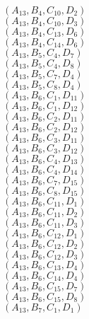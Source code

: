 \documentclass[14pt]{article}
\begin{document}
    $({A}_{13}, {B}_{4}, {C}_{10}, {D}_{2}) $ \\ 
    $({A}_{13}, {B}_{4}, {C}_{10}, {D}_{3}) $ \\ 
    $({A}_{13}, {B}_{4}, {C}_{13}, {D}_{6}) $ \\ 
    $({A}_{13}, {B}_{4}, {C}_{14}, {D}_{6}) $ \\ 
    $({A}_{13}, {B}_{5}, {C}_{4}, {D}_{7}) $ \\ 
    $({A}_{13}, {B}_{5}, {C}_{4}, {D}_{8}) $ \\ 
    $({A}_{13}, {B}_{5}, {C}_{7}, {D}_{4}) $ \\ 
    $({A}_{13}, {B}_{5}, {C}_{8}, {D}_{4}) $ \\ 
    $({A}_{13}, {B}_{6}, {C}_{1}, {D}_{11}) $ \\ 
    $({A}_{13}, {B}_{6}, {C}_{1}, {D}_{12}) $ \\ 
    $({A}_{13}, {B}_{6}, {C}_{2}, {D}_{11}) $ \\ 
    $({A}_{13}, {B}_{6}, {C}_{2}, {D}_{12}) $ \\ 
    $({A}_{13}, {B}_{6}, {C}_{3}, {D}_{11}) $ \\ 
    $({A}_{13}, {B}_{6}, {C}_{3}, {D}_{12}) $ \\ 
    $({A}_{13}, {B}_{6}, {C}_{4}, {D}_{13}) $ \\ 
    $({A}_{13}, {B}_{6}, {C}_{4}, {D}_{14}) $ \\ 
    $({A}_{13}, {B}_{6}, {C}_{7}, {D}_{15}) $ \\ 
    $({A}_{13}, {B}_{6}, {C}_{8}, {D}_{15}) $ \\ 
    $({A}_{13}, {B}_{6}, {C}_{11}, {D}_{1}) $ \\ 
    $({A}_{13}, {B}_{6}, {C}_{11}, {D}_{2}) $ \\ 
    $({A}_{13}, {B}_{6}, {C}_{11}, {D}_{3}) $ \\ 
    $({A}_{13}, {B}_{6}, {C}_{12}, {D}_{1}) $ \\ 
    $({A}_{13}, {B}_{6}, {C}_{12}, {D}_{2}) $ \\ 
    $({A}_{13}, {B}_{6}, {C}_{12}, {D}_{3}) $ \\ 
    $({A}_{13}, {B}_{6}, {C}_{13}, {D}_{4}) $ \\ 
    $({A}_{13}, {B}_{6}, {C}_{14}, {D}_{4}) $ \\ 
    $({A}_{13}, {B}_{6}, {C}_{15}, {D}_{7}) $ \\ 
    $({A}_{13}, {B}_{6}, {C}_{15}, {D}_{8}) $ \\ 
    $({A}_{13}, {B}_{7}, {C}_{1}, {D}_{1}) $ \\ 
\end{document}
